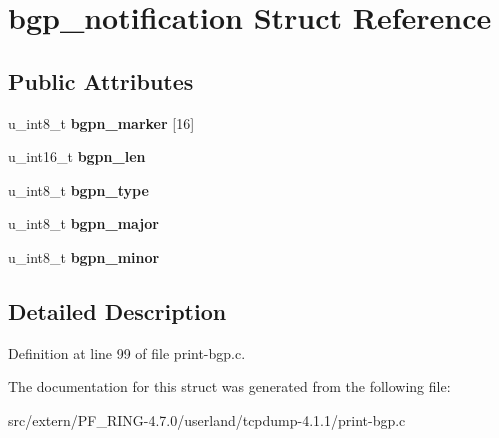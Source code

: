 \hypertarget{structbgp__notification}{
\section{bgp\_\-notification Struct Reference}
\label{structbgp__notification}
}
\subsection*{Public Attributes}
\begin{DoxyCompactItemize}
\item 
\hypertarget{structbgp__notification_af62af0447b6cb42b6c78926a1ea0440f}{
u\_\-int8\_\-t {\bfseries bgpn\_\-marker} \mbox{[}16\mbox{]}}
\label{structbgp__notification_af62af0447b6cb42b6c78926a1ea0440f}

\item 
\hypertarget{structbgp__notification_a0d8376486e64ebf483398ee24bb0ede3}{
u\_\-int16\_\-t {\bfseries bgpn\_\-len}}
\label{structbgp__notification_a0d8376486e64ebf483398ee24bb0ede3}

\item 
\hypertarget{structbgp__notification_a54079699f12e6e67ffc12d77aeac264f}{
u\_\-int8\_\-t {\bfseries bgpn\_\-type}}
\label{structbgp__notification_a54079699f12e6e67ffc12d77aeac264f}

\item 
\hypertarget{structbgp__notification_a4c4924dcb7cffd659fc95413debbd007}{
u\_\-int8\_\-t {\bfseries bgpn\_\-major}}
\label{structbgp__notification_a4c4924dcb7cffd659fc95413debbd007}

\item 
\hypertarget{structbgp__notification_a2d9ad6d982ccddee7dc98b0f63db3945}{
u\_\-int8\_\-t {\bfseries bgpn\_\-minor}}
\label{structbgp__notification_a2d9ad6d982ccddee7dc98b0f63db3945}

\end{DoxyCompactItemize}


\subsection{Detailed Description}


Definition at line 99 of file print-\/bgp.c.



The documentation for this struct was generated from the following file:\begin{DoxyCompactItemize}
\item 
src/extern/PF\_\-RING-\/4.7.0/userland/tcpdump-\/4.1.1/print-\/bgp.c\end{DoxyCompactItemize}
